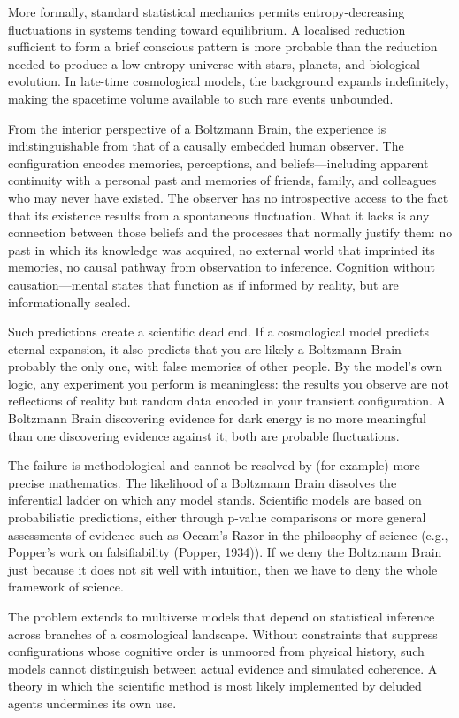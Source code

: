 More formally, standard statistical mechanics permits entropy-decreasing fluctuations in systems tending toward equilibrium. A localised reduction sufficient to form a brief conscious pattern is more probable than the reduction needed to produce a low-entropy universe with stars, planets, and biological evolution. In late-time cosmological models, the background expands indefinitely, making the spacetime volume available to such rare events unbounded.

From the interior perspective of a Boltzmann Brain, the experience is indistinguishable from that of a causally embedded human observer. The configuration encodes memories, perceptions, and beliefs—including apparent continuity with a personal past and memories of friends, family, and colleagues who may never have existed. The observer has no introspective access to the fact that its existence results from a spontaneous fluctuation. What it lacks is any connection between those beliefs and the processes that normally justify them: no past in which its knowledge was acquired, no external world that imprinted its memories, no causal pathway from observation to inference. Cognition without causation—mental states that function as if informed by reality, but are informationally sealed.

Such predictions create a scientific dead end. If a cosmological model predicts eternal expansion, it also predicts that you are likely a Boltzmann Brain—probably the only one, with false memories of other people. By the model's own logic, any experiment you perform is meaningless: the results you observe are not reflections of reality but random data encoded in your transient configuration. A Boltzmann Brain \QSOpen{}discovering\QSClose{} evidence for dark energy is no more meaningful than one \QSOpen{}discovering\QSClose{} evidence against it; both are probable fluctuations.

The failure is methodological and cannot be resolved by (for example) more precise mathematics. The likelihood of a Boltzmann Brain dissolves the inferential ladder on which any model stands. Scientific models are based on probabilistic predictions, either through p-value comparisons or more general assessments of evidence such as Occam's Razor in the philosophy of science (e.g., Popper's work on falsifiability (Popper, 1934)). If we deny the Boltzmann Brain just because it does not sit well with intuition, then we have to deny the whole framework of science.

The problem extends to multiverse models that depend on statistical inference across branches of a cosmological landscape. Without constraints that suppress configurations whose cognitive order is unmoored from physical history, such models cannot distinguish between actual evidence and simulated coherence. A theory in which the scientific method is most likely implemented by deluded agents undermines its own use.

